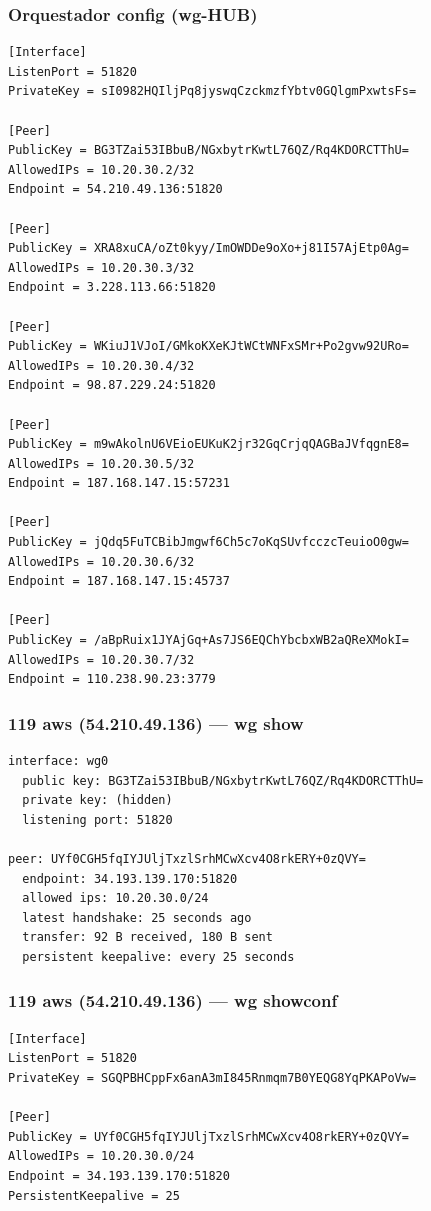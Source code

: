 \documentclass[11pt,a4paper]{article}
\begin{document}
\subsubsection*{Orquestador config (wg-HUB)}
\begin{lstlisting}
[Interface]
ListenPort = 51820
PrivateKey = sI0982HQIljPq8jyswqCzckmzfYbtv0GQlgmPxwtsFs=

[Peer]
PublicKey = BG3TZai53IBbuB/NGxbytrKwtL76QZ/Rq4KDORCTThU=
AllowedIPs = 10.20.30.2/32
Endpoint = 54.210.49.136:51820

[Peer]
PublicKey = XRA8xuCA/oZt0kyy/ImOWDDe9oXo+j81I57AjEtp0Ag=
AllowedIPs = 10.20.30.3/32
Endpoint = 3.228.113.66:51820

[Peer]
PublicKey = WKiuJ1VJoI/GMkoKXeKJtWCtWNFxSMr+Po2gvw92URo=
AllowedIPs = 10.20.30.4/32
Endpoint = 98.87.229.24:51820

[Peer]
PublicKey = m9wAkolnU6VEioEUKuK2jr32GqCrjqQAGBaJVfqgnE8=
AllowedIPs = 10.20.30.5/32
Endpoint = 187.168.147.15:57231

[Peer]
PublicKey = jQdq5FuTCBibJmgwf6Ch5c7oKqSUvfcczcTeuioO0gw=
AllowedIPs = 10.20.30.6/32
Endpoint = 187.168.147.15:45737

[Peer]
PublicKey = /aBpRuix1JYAjGq+As7JS6EQChYbcbxWB2aQReXMokI=
AllowedIPs = 10.20.30.7/32
Endpoint = 110.238.90.23:3779

\end{lstlisting}

\subsubsection*{119 aws (54.210.49.136) — wg show}
\begin{lstlisting}
interface: wg0
  public key: BG3TZai53IBbuB/NGxbytrKwtL76QZ/Rq4KDORCTThU=
  private key: (hidden)
  listening port: 51820

peer: UYf0CGH5fqIYJUljTxzlSrhMCwXcv4O8rkERY+0zQVY=
  endpoint: 34.193.139.170:51820
  allowed ips: 10.20.30.0/24
  latest handshake: 25 seconds ago
  transfer: 92 B received, 180 B sent
  persistent keepalive: every 25 seconds

\end{lstlisting}

\subsubsection*{119 aws (54.210.49.136) — wg showconf}
\begin{lstlisting}
[Interface]
ListenPort = 51820
PrivateKey = SGQPBHCppFx6anA3mI845Rnmqm7B0YEQG8YqPKAPoVw=

[Peer]
PublicKey = UYf0CGH5fqIYJUljTxzlSrhMCwXcv4O8rkERY+0zQVY=
AllowedIPs = 10.20.30.0/24
Endpoint = 34.193.139.170:51820
PersistentKeepalive = 25

\end{lstlisting}
\end{document}
